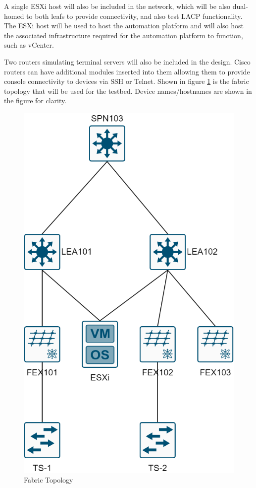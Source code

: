 A single ESXi host will also be included in the network,
which will be also dual-homed to both leafs to provide connectivity, and also
test LACP functionality. The ESXi host will be used to host the automation
platform and will also host the associated infrastructure required for the
automation platform to function, such as vCenter.

Two routers simulating
terminal servers will also be included in the design. Cisco routers can have
additional modules inserted into them allowing them to provide console
connectivity to devices via SSH or Telnet.
Shown in figure
\ref{fig:fabric-topology} is the fabric topology that will be used for the
testbed. Device names/hostnames are shown in the figure for clarity.

\begin{figure}[H]
    \centering

    \includegraphics[scale=0.3]{images/aci-topology.png}
    \caption{Fabric
        Topology}
    \label{fig:fabric-topology}
\end{figure}

